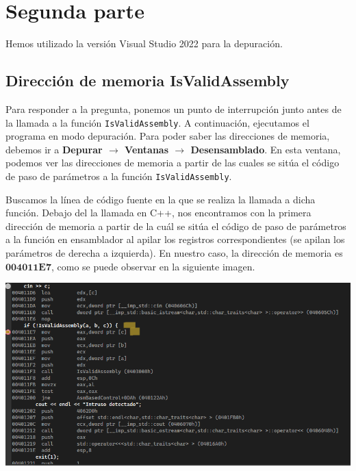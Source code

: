 \documentclass[11pt,a4paper]{article}
\begin{document}
\section{Segunda parte}
Hemos utilizado la versión Visual Studio 2022 para la depuración.
\subsection{Dirección de memoria IsValidAssembly}
Para responder a la pregunta, ponemos un punto de interrupción junto antes de la llamada a la
función \texttt{IsValidAssembly}. A continuación, ejecutamos el programa en modo depuración.
Para poder saber las 
direcciones de memoria, debemos ir a \textbf{Depurar \(\rightarrow\) Ventanas \(\rightarrow\) Desensamblado}. En esta ventana, 
podemos ver las direcciones de memoria a partir de las cuales se sitúa el código de paso de parámetros a la función \texttt{IsValidAssembly}.

\vspace{1ex}
\indent Buscamos la línea de código fuente en la que se realiza la llamada a dicha función. Debajo del la llamada en C++,
nos encontramos con la primera dirección de memoria a partir de la cuál se sitúa el código de paso de parámetros a la 
función en ensamblador al apilar los registros correspondientes (se apilan los parámetros de derecha a izquierda).
En nuestro caso, la dirección de memoria es \(\mathbf{004011E7}\), como se puede observar en la siguiente imagen.
\begin{center}
\includegraphics[width=\textwidth]{direccionIsValid.PNG}
\end{center}
\vspace{1ex}
\end{document}

